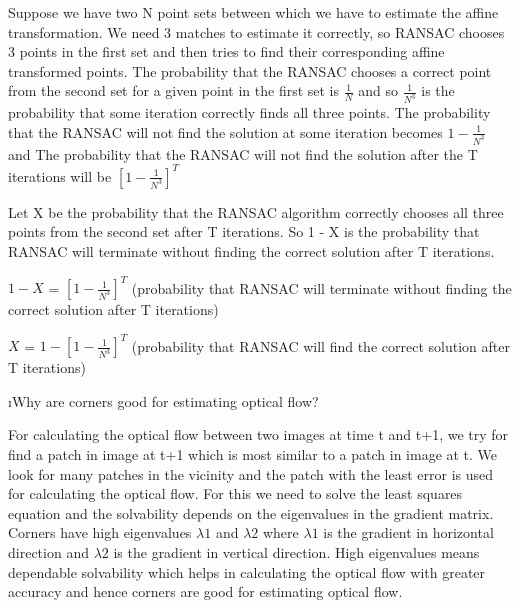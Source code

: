 \documentclass[fleqn]{article}
\begin{document}
\begin{solution}


Suppose we have two N point sets between which we have to estimate the affine transformation. We need 3 matches to estimate it correctly, so RANSAC chooses 3 points in the first set and then tries to find their corresponding affine transformed points. The probability that the RANSAC chooses a correct point from the second set for a given point in the first set is $\frac{1}{N}$ and so $\frac{1}{N^3}$ is the probability that some iteration correctly finds all three points. The probability that the RANSAC will not find the solution at some iteration becomes $1 - \frac{1}{N^3}$  and The probability that the RANSAC will not find the solution after the T iterations will be  $[1 - \frac{1}{N^3}]^T$
 
 \vspace{0.2 cm}

 
 \vspace{0.2 cm}
Let X be the probability that the RANSAC algorithm correctly chooses all three points from the second set after T iterations. So 1 - X is the probability that RANSAC will terminate without finding the correct solution after T iterations.
 
 \vspace{0.2 cm}

 {\centering
  $1 - X$ = $[1 - \frac{1}{N^3}]^T$  (probability that RANSAC will terminate without finding the correct solution after T iterations)\par
 \vspace{0.1 cm}
 $X$ =  $1 - [1 - \frac{1}{N^3}]^T$ (probability that RANSAC will find the correct solution after T iterations) \par
}

\end{solution}

\ene
\i Why are corners good for estimating optical flow?
\ene
\begin{solution}
For calculating the optical flow between two images at time t and t+1, we try for find a patch in image at t+1 which is most similar to a patch in image at t. We look for many patches in the vicinity and the patch with the least error is used for calculating the optical flow. For this we need to solve the least squares equation and the solvability depends on the eigenvalues in the gradient matrix. Corners have high eigenvalues $\lambda1$ and $\lambda2$ where  $\lambda1$ is the gradient in horizontal direction and $\lambda2$ is the gradient in vertical direction. High eigenvalues means dependable solvability which helps in calculating the optical flow with greater accuracy and hence corners are good for estimating optical flow. 



\end{solution}
\end{document}
